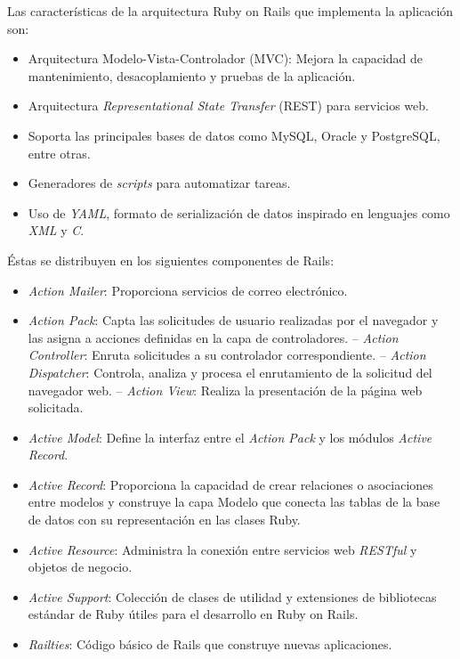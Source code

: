 Las características de la arquitectura Ruby on Rails que implementa la aplicación son:
\begin{itemize}
\item Arquitectura Modelo-Vista-Controlador (MVC): Mejora la capacidad de mantenimiento, desacoplamiento y pruebas de la aplicación.
\item Arquitectura \textit{Representational State Transfer} (REST) para servicios web.
\item Soporta las principales bases de datos como MySQL, Oracle y PostgreSQL, entre otras.
\item Generadores de \textit{scripts} para automatizar tareas.
\item Uso de \textit{YAML}, formato de serialización de datos inspirado en lenguajes como \textit{XML} y \textit{C}.
\end{itemize}

Éstas se distribuyen en los siguientes componentes de Rails:
\begin{itemize}
\item \textit{Action Mailer}: Proporciona servicios de correo electrónico. 
\item \textit{Action Pack}: Capta las solicitudes de usuario realizadas por el navegador y las asigna a acciones definidas en la capa de controladores.
\subitem-- \textit{Action Controller}: Enruta solicitudes a su controlador correspondiente. 
\subitem-- \textit{Action Dispatcher}: Controla, analiza y procesa el enrutamiento de la solicitud del navegador web.
\subitem-- \textit{Action View}: Realiza la presentación de la página web solicitada.
\item \textit{Active Model}: Define la interfaz entre el \textit{Action Pack} y los módulos \textit{Active Record}.
\item \textit{Active Record}: Proporciona la capacidad de crear relaciones o asociaciones entre modelos y construye la capa Modelo que conecta las tablas de la base de datos con su representación en las clases Ruby.
\item \textit{Active Resource}: Administra la conexión entre servicios web \textit{RESTful} y objetos de negocio.
\item \textit{Active Support}: Colección de clases de utilidad y extensiones de bibliotecas estándar de Ruby útiles para el desarrollo en Ruby on Rails.
\item \textit{Railties}: Código básico de Rails que construye nuevas aplicaciones. 
\end{itemize}	 

